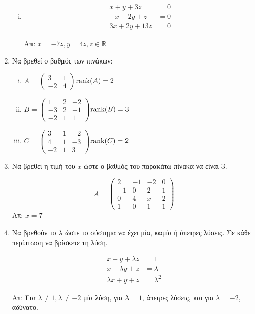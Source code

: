 \documentclass[a4paper,12pt]{article}
\begin{document}
\begin{enumerate}
\begin{enumerate}[i)]
\item 
\begin{align*}
x+y+3z&=0\\
-x-2y+z&=0 \\
3x+2y+13z&=0 
\end{align*}

 Απ: $x=-7z, y=4z, z \in \mathbb{R}$
\end{enumerate}

\item Να βρεθεί ο βαθμός των πινάκων:
\begin{enumerate}[i)]
\item 
\(A=\begin{pmatrix}
3 & 1\\
-2 & 4
\end{pmatrix}
\)\hfill $\rank(A)=2$
\item 
\(
B=\begin{pmatrix}
1 & 2 & -2 \\
-3 & 2 & -1 \\
-2 & 1 & 1
\end{pmatrix}
\)\hfill $\rank(B)=3$
\item 
\(
C=\begin{pmatrix}
3 & 1 & -2 \\
4 & 1 & -3 \\
-2 & 1 & 3
\end{pmatrix}
\)\hfill $\rank(C)=2$
\end{enumerate}

\item Να βρεθεί η τιμή του $x$ ώστε ο βαθμός του παρακάτω πίνακα να είναι 3.

\[
Α=\begin{pmatrix}
2 & -1 & -2 & 0 \\
-1 & 0 & 2 & 1 \\
0 & 4 & x & 2 \\
1 & 0 & 1 & 1 
\end{pmatrix}
\]\hfill Απ: $x=7$

\item Να βρεθούν το $\lambda$ ώστε το σύστημα να έχει μία, καμία ή άπειρες λύσεις. Σε κάθε περίπτωση να βρίσκετε τη λύση.


\begin{align*}
x+y+\lambda z&=1\\
x+\lambda y+z&=\lambda \\
\lambda x+y+z&=\lambda^2 
\end{align*}

Απ: Για $\lambda\neq 1, \lambda\neq -2$ μία λύση, για $\lambda=1$, άπειρες λύσεις, και για $\lambda=-2$, αδύνατο.
\end{enumerate}
\end{document}
